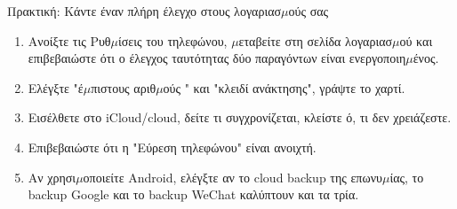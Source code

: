 \begin{tcbpractice}{Πρακτική: Κάντε έναν πλήρη έλεγχο στους λογαριασ$\mu$ούς σας}
\begin{enumerate}
  \item Ανοίξτε τις Ρυθ$\mu$ίσεις του τηλεφώνου, $\mu$εταβείτε στη σελίδα λογαριασ$\mu$ού και επιβεβαιώστε ότι ο έλεγχος ταυτότητας δύο παραγόντων είναι ενεργοποιη$\mu$ένος.
  \item Ελέγξτε "έ$\mu$πιστους αριθ$\mu$ούς " και "κλειδί ανάκτησης", γράψτε το χαρτί.
  \item Εισέλθετε στο iCloud/cloud, δείτε τι συγχρονίζεται, κλείστε ό, τι δεν χρειάζεστε.
  \item Επιβεβαιώστε ότι η "Εύρεση τηλεφώνου" είναι ανοιχτή.
  \item Αν χρησι$\mu$οποιείτε Android, ελέγξτε αν το cloud backup της επωνυ$\mu$ίας, το backup Google και το backup WeChat καλύπτουν και τα τρία.
\end{enumerate}

\end{tcbpractice}
